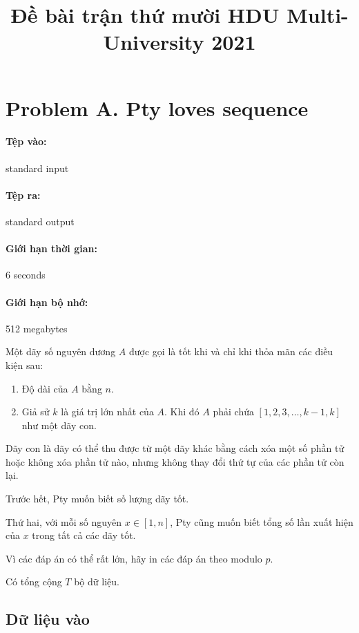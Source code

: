 \documentclass[11pt]{article}
\title{Đề bài trận thứ mười HDU Multi-University 2021}
\author{}
\date{}
\begin{document}
\maketitle


\section{Problem A. Pty loves sequence}

\paragraph{Tệp vào:} standard input
\paragraph{Tệp ra:} standard output
\paragraph{Giới hạn thời gian:} 6 seconds
\paragraph{Giới hạn bộ nhớ:} 512 megabytes

Một dãy số nguyên dương \(A\) được gọi là tốt khi và chỉ khi thỏa mãn các
điều kiện sau:
\begin{enumerate}
  \item Độ dài của \(A\) bằng \(n\).
  \item Giả sử \(k\) là giá trị lớn nhất của \(A\). Khi đó \(A\) phải chứa
  \([1,2,3,\ldots,k-1,k]\) như một dãy con.
\end{enumerate}

Dãy con là dãy có thể thu được từ một dãy khác bằng cách xóa một số phần tử
hoặc không xóa phần tử nào, nhưng không thay đổi thứ tự của các phần tử còn
lại.

Trước hết, Pty muốn biết số lượng dãy tốt.

Thứ hai, với mỗi số nguyên \(x\in[1,n]\), Pty cũng muốn biết tổng số lần xuất
hiện của \(x\) trong tất cả các dãy tốt.

Vì các đáp án có thể rất lớn, hãy in các đáp án theo modulo \(p\).

Có tổng cộng \(T\) bộ dữ liệu.

\subsection*{Dữ liệu vào}
\end{document}
